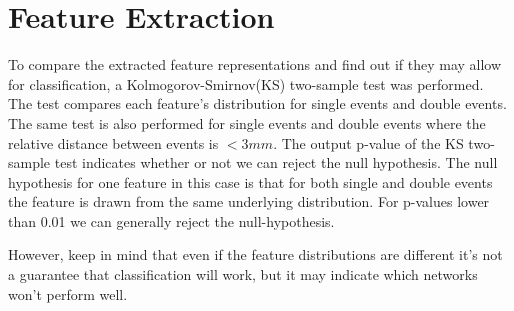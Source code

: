\documentclass[12pt, notitlepage]{article}
\begin{document}
\section{Feature Extraction}
To compare the extracted feature representations and find out if they may allow for classification,
a Kolmogorov-Smirnov(KS) two-sample test was performed. The test compares each feature's distribution
for single events and double events. The same test is also performed for single events and double events 
where the relative distance between events is $< 3mm$. The output p-value of the KS two-sample test
indicates whether or not we can reject the null hypothesis. The null hypothesis for one feature in this 
case is that for both single and double events the feature is drawn from the same underlying distribution.
For p-values lower than 0.01 we can generally reject the null-hypothesis. 

However, keep in mind that even if the feature distributions are different it's not a guarantee that 
classification will work, but it may indicate which networks won't perform well.
\end{document}
